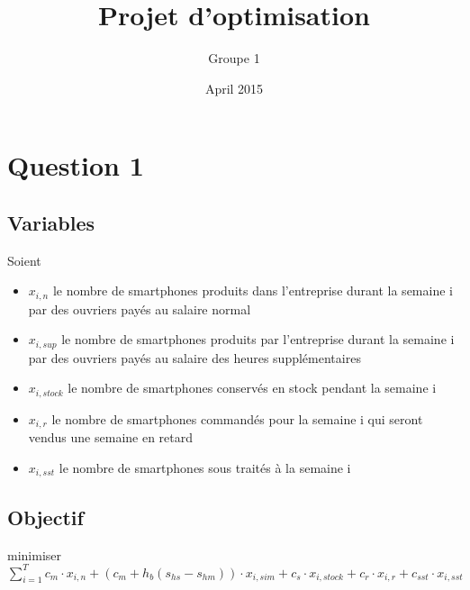 \documentclass{article}
\title{Projet d'optimisation}
\author{Groupe 1}
\date{April 2015}
\begin{document}
\maketitle

\section{Question 1}

\subsection*{Variables}
Soient 
\begin{itemize}
\item $x_{i,n}$ le nombre de smartphones produits dans l'entreprise durant la semaine i par des ouvriers payés au salaire normal
\item $x_{i,sup}$ le nombre de smartphones produits par l'entreprise durant la semaine i par des ouvriers payés au salaire des heures supplémentaires

\item $x_{i,stock}$ le nombre de smartphones conservés en stock pendant la semaine i
\item $x_{i,r}$ le nombre de smartphones commandés pour la semaine i qui seront vendus une semaine en retard
\item $x_{i,sst}$ le nombre de smartphones sous traités à la semaine i
\end{itemize}

\subsection*{Objectif}

minimiser $\sum_{i=1}^{T} c_m \cdot x_{i,n} + (c_m + h_b (s_{hs} - s_{hm})) \cdot x_{i,sim} + c_s \cdot x_{i,stock} + c_r \cdot x_{i,r} + c_{sst} \cdot x_{i,sst} $
\end{document}
